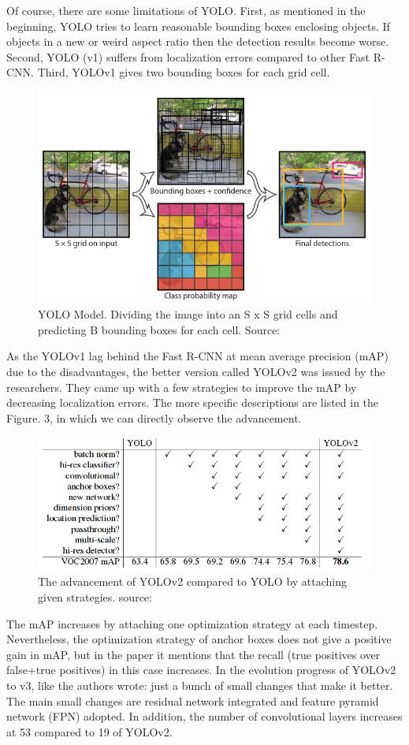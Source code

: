 \documentclass[runningheads]{llncs}
\begin{document}
Of course, there are some limitations of YOLO. First, as mentioned in the beginning, YOLO tries to learn reasonable bounding boxes enclosing objects. If objects in a new or weird aspect ratio then the detection results become worse. Second, YOLO (v1) suffers from localization errors compared to other Fast R-CNN. Third, YOLOv1 gives two bounding boxes for each grid cell.
\begin{figure}
\includegraphics[width=\textwidth]{figs/YOLO_model.png}
\caption{YOLO Model. Dividing the image into an S x S grid cells and predicting B bounding boxes for each cell. Source: ~\cite{ref_yolov1}} \label{fig5}
\end{figure}
As the YOLOv1 lag behind the Fast R-CNN at mean average precision (mAP) due to the disadvantages, the better version called YOLOv2 was issued by the researchers. They came up with a few strategies to improve the mAP by decreasing localization errors. The more specific descriptions are listed in the Figure. 3, in which we can directly observe the advancement.
\begin{figure}
\includegraphics[width=\textwidth]{figs/YOLOv1_to_v2.png}
\caption{The advancement of YOLOv2 compared to YOLO by attaching given strategies. source: ~\cite{ref_yolov2}} \label{fig6}
\end{figure}
The mAP increases by attaching one optimization strategy at each timestep. Nevertheless, the optimization strategy of anchor boxes does not give a positive gain in mAP, but in the paper it mentions that the recall (true positives over false+true positives) in this case increases.
In the evolution progress of YOLOv2 to v3, like the authors wrote: just a bunch of small changes that make it better. The main small changes are residual network integrated and feature pyramid network (FPN) adopted. In addition, the number of convolutional layers increases at 53 compared to 19 of YOLOv2. 
\end{document}
